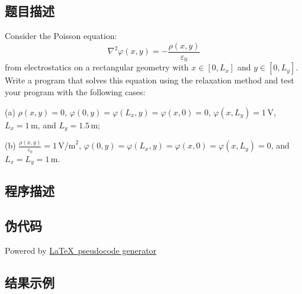 
\subsection{题目描述}
\noindent
Consider the Poisson equation:
\[
    \nabla^2 \varphi(x, y) = -\frac{\rho(x, y)}{\varepsilon_0}
\]
from electrostatics on a rectangular geometry with \(x \in [0, L_x]\) and \(y \in [0, L_y]\). Write a program that solves this equation using the relaxation method and test your program with the following cases:

\noindent
(a) \(\rho(x, y) = 0\), \(\varphi(0, y) = \varphi(L_x, y) = \varphi(x, 0) = 0\), \(\varphi(x, L_y) = 1 \, \text{V}\),
\(L_x = 1 \, \text{m}\), and \(L_y = 1.5 \, \text{m}\);

\noindent
(b) \(\frac{\rho(x, y)}{\varepsilon_0} = 1 \, \text{V/m}^2\), \(\varphi(0, y) = \varphi(L_x, y) = \varphi(x, 0) = \varphi(x, L_y) = 0\), and \(L_x = L_y = 1 \, \text{m}\).


\subsection{程序描述}

\subsection{伪代码}
Powered by \href{https://chatgpt.com/g/g-xJJAA2awf-latex-pseudocode-generator}{\LaTeX \ pseudocode generator}


\subsection{结果示例}
